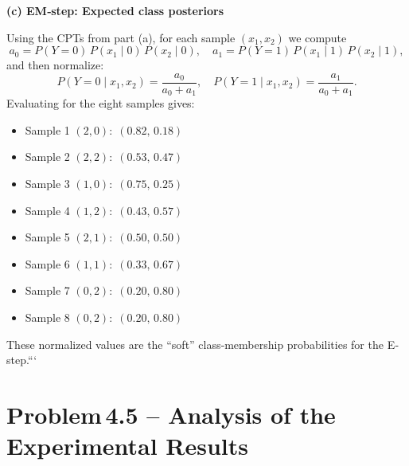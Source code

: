 \documentclass[11pt]{article}
\begin{document}
\bigskip
\noindent\textbf{(c) EM‐step: Expected class posteriors}

Using the CPTs from part (a), for each sample $(x_1,x_2)$ we compute
\[
  a_0 = P(Y=0)\,P(x_1\mid0)\,P(x_2\mid0),\quad
  a_1 = P(Y=1)\,P(x_1\mid1)\,P(x_2\mid1),
\]
and then normalize:
\[
  P(Y=0\mid x_1,x_2)=\frac{a_0}{a_0+a_1},\quad
  P(Y=1\mid x_1,x_2)=\frac{a_1}{a_0+a_1}.
\]
Evaluating for the eight samples gives:
\begin{itemize}[nosep]
  \item Sample 1 $(2,0):\;(0.82,\,0.18)$
  \item Sample 2 $(2,2):\;(0.53,\,0.47)$
  \item Sample 3 $(1,0):\;(0.75,\,0.25)$
  \item Sample 4 $(1,2):\;(0.43,\,0.57)$
  \item Sample 5 $(2,1):\;(0.50,\,0.50)$
  \item Sample 6 $(1,1):\;(0.33,\,0.67)$
  \item Sample 7 $(0,2):\;(0.20,\,0.80)$
  \item Sample 8 $(0,2):\;(0.20,\,0.80)$
\end{itemize}
These normalized values are the “soft” class‐membership probabilities for the E‐step.```

\section*{Problem\,4.5  \;--\;  Analysis of the Experimental Results}
\end{document}
